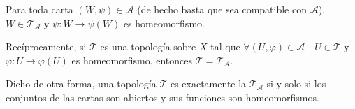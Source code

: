\documentclass[../VD.tex]{subfiles}
\begin{document}
\begin{lemma}
  \label{lem:caract-topnat-2}
  Para toda carta \((W,\psi) \in \mathcal{A}\) (de hecho basta que sea
  compatible con \(\mathcal{A}\)), \(W \in
  \mathcal{T}_{\mathcal{A}}\) y \(\psi \colon W \to \psi(W)\) es homeomorfismo.

  Recíprocamente, si \(\mathcal{T}\) es una topología sobre \(X\) tal que
  \(\forall (U,\varphi) \in \mathcal{A} \quad U \in \mathcal{T}\) y \(\varphi
  \colon U \to \varphi(U)\) es homeomorfismo, entonces \(\mathcal{T} =
  \mathcal{T}_{\mathcal{A}}\).

  Dicho de otra forma, una topología \(\mathcal{T}\) es exactamente la
   \(\mathcal{T}_{\mathcal{A}}\) si y solo si los conjuntos
  de las cartas son abiertos y sus funciones son homeomorfismos.
\end{lemma}
\end{document}
